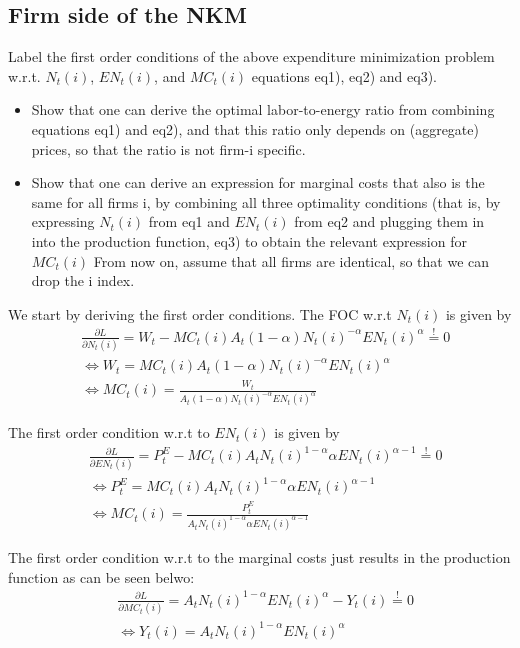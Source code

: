 \documentclass[a4paper,11pt]{article}
\begin{document}
\begin{qbox}{\subsection{Firm side of the NKM}}
Label the first order conditions of the above expenditure minimization problem w.r.t. $N_t(i)$, $EN_t(i)$, and $MC_t(i)$ equations eq1), eq2) and eq3).
\begin{itemize}
    \item Show that one can derive the optimal labor-to-energy ratio from combining equations eq1) and eq2), and that this ratio only depends on (aggregate) prices, so that the ratio is not firm-i specific.
    \item Show that one can derive an expression for marginal costs that also is the same for all firms i, by combining all three optimality conditions (that is, by expressing $N_t(i)$ from eq1 and $EN_t(i)$ from eq2 and plugging them in into the production function, eq3) to obtain the relevant expression for $MC_t(i)$ From now on, assume that all firms are identical, so that we can drop the i index.
\end{itemize}
\end{qbox}


We start by deriving the first order conditions. The FOC w.r.t $N_t(i)$ is given by
\begin{align*}
&\frac{\partial L}{\partial N_t(i)}  = W_t - MC_t(i)A_t (1-\alpha) N_t(i)^{-\alpha}EN_t(i)^\alpha \overset{!}{=} 0 \\
&\iff W_t = MC_t(i)A_t (1-\alpha) N_t(i)^{-\alpha}EN_t(i)^\alpha \\
&\iff MC_t(i) = \frac{W_t}{A_t (1-\alpha)N_t(i)^{-\alpha}EN_t(i)^\alpha}
\end{align*}

The first order condition w.r.t to $EN_t(i)$ is given by
\begin{align*}
&\frac{\partial L}{\partial EN_t(i)}  = P^E_t - MC_t(i)A_t N_t(i)^{1-\alpha}\alpha EN_t(i)^{\alpha-1} \overset{!}{=} 0 \\
&\iff P^E_t = MC_t(i)A_t N_t(i)^{1-\alpha}\alpha EN_t(i)^{\alpha-1} \\
&\iff MC_t(i) = \frac{P^E_t }{A_t N_t(i)^{1-\alpha}\alpha EN_t(i)^{\alpha-1}}
\end{align*}

The first order condition w.r.t to the marginal costs just results in the production function as can be seen belwo:
\begin{align*}
&\frac{\partial L}{\partial MC_t(i)}  = A_tN_t(i)^{1-\alpha}EN_t(i)^\alpha-Y_t(i) \overset{!}{=} 0 \\
&\iff Y_t(i) = A_tN_t(i)^{1-\alpha}EN_t(i)^\alpha
\end{align*}
\end{document}
